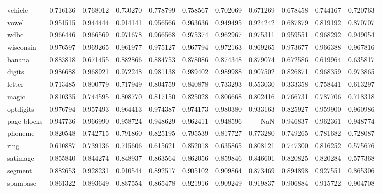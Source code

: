 \begin{tabular}{lrrrrrrrrrr}
vehicle         &   0.716136 &  0.768012 &  0.730270 &  0.778799 &  0.758567 &  0.702069 &  0.671269 &  0.678458 &  0.744167 &  0.720763 \\
vowel           &   0.951515 &  0.944444 &  0.914141 &  0.956566 &  0.963636 &  0.949495 &  0.924242 &  0.687879 &  0.819192 &  0.870707 \\
wdbc            &   0.966446 &  0.966569 &  0.971678 &  0.966568 &  0.975374 &  0.962967 &  0.975311 &  0.959551 &  0.968292 &  0.949054 \\
wisconsin       &   0.976597 &  0.969265 &  0.961977 &  0.975127 &  0.967794 &  0.972163 &  0.969265 &  0.973677 &  0.966388 &  0.967816 \\
banana          &   0.883818 &  0.671455 &  0.882866 &  0.884753 &  0.878086 &  0.874348 &  0.879074 &  0.672586 &  0.619964 &  0.635817 \\
digits          &   0.986688 &  0.968921 &  0.972248 &  0.981138 &  0.989402 &  0.989988 &  0.907502 &  0.826871 &  0.968359 &  0.973865 \\
letter          &   0.713485 &  0.800779 &  0.717949 &  0.804759 &  0.840878 &  0.733293 &  0.553030 &  0.333358 &  0.758441 &  0.613297 \\
magic           &   0.810335 &  0.744595 &  0.808770 &  0.817150 &  0.825028 &  0.806668 &  0.802416 &  0.766731 &  0.787706 &  0.718318 \\
optdigits       &   0.976794 &  0.957493 &  0.964413 &  0.974387 &  0.974173 &  0.980380 &  0.933163 &  0.825927 &  0.959900 &  0.960986 \\
page-blocks     &   0.947736 &  0.966990 &  0.958724 &  0.948629 &  0.962411 &  0.948596 &       NaN &  0.946837 &  0.962361 &  0.948774 \\
phoneme         &   0.820548 &  0.742715 &  0.791860 &  0.825195 &  0.795539 &  0.817727 &  0.773280 &  0.749265 &  0.781682 &  0.728087 \\
ring            &   0.610887 &  0.739136 &  0.715606 &  0.615621 &  0.852018 &  0.635865 &  0.808121 &  0.747300 &  0.816252 &  0.575676 \\
satimage        &   0.855840 &  0.844274 &  0.848937 &  0.863564 &  0.862056 &  0.859846 &  0.846601 &  0.820825 &  0.820284 &  0.577368 \\
segment         &   0.882653 &  0.928231 &  0.910544 &  0.892517 &  0.905102 &  0.909864 &  0.873469 &  0.894898 &  0.927551 &  0.865306 \\
spambase        &   0.861322 &  0.893649 &  0.887554 &  0.865478 &  0.921916 &  0.909249 &  0.919837 &  0.906884 &  0.915722 &  0.904708 \\

\end{tabular}
